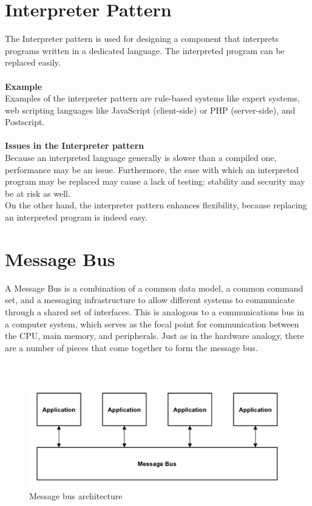 \documentclass{article}
\begin{document}
\section{Interpreter Pattern}
The Interpreter pattern is used for designing a component that interprets programs written in a dedicated language. The interpreted program can be replaced easily.\\\\
\textbf{Example}
\\Examples of the interpreter pattern are rule-based systems like expert systems, web scripting languages like JavaScript (client-side) or PHP (server-side), and Postscript.\\\\
\textbf{Issues in the Interpreter pattern}
\\Because an interpreted language generally is slower than a compiled one, performance may be an issue. Furthermore, the ease with which an interpreted program may be replaced may cause a lack of testing: stability and security may be at risk as well.\\
On the other hand, the interpreter pattern enhances flexibility, because replacing an interpreted program is indeed easy.

\newpage




\section{Message Bus}
A Message Bus is a combination of a common data model, a common command set, and a messaging infrastructure to allow different systems to communicate through a shared set of interfaces. This is analogous to a communications bus in a computer system, which serves as the focal point for communication between the CPU, main memory, and peripherals. Just as in the hardware analogy, there are a number of pieces that come together to form the message bus.\\\\\\


\begin{figure}[h]
\centering
\includegraphics[scale=0.55]{mb.jpg}
\caption{Message bus architecture}
\label{fig_mb}
\end{figure}
\newpage
\end{document}
